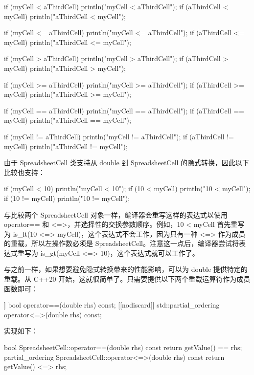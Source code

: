 \begin{cpp}
if (myCell < aThirdCell) { println("myCell < aThirdCell"); }
if (aThirdCell < myCell) { println("aThirdCell < myCell"); }

if (myCell <= aThirdCell) { println("myCell <= aThirdCell"); }
if (aThirdCell <= myCell) { println("aThirdCell <= myCell"); }

if (myCell > aThirdCell) { println("myCell > aThirdCell"); }
if (aThirdCell > myCell) { println("aThirdCell > myCell"); }

if (myCell >= aThirdCell) { println("myCell >= aThirdCell"); }
if (aThirdCell >= myCell) { println("aThirdCell >= myCell"); }

if (myCell == aThirdCell) { println("myCell == aThirdCell"); }
if (aThirdCell == myCell) { println("aThirdCell == myCell"); }

if (myCell != aThirdCell) { println("myCell != aThirdCell"); }
if (aThirdCell != myCell) { println("aThirdCell != myCell"); }
\end{cpp}

由于 SpreadsheetCell 类支持从 double 到 SpreadsheetCell 的隐式转换，因此以下比较也支持：

\begin{cpp}
if (myCell < 10) { println("myCell < 10"); }
if (10 < myCell) { println("10 < myCell"); }
if (10 != myCell) { println("10 != myCell"); }
\end{cpp}

与比较两个 SpreadsheetCell 对象一样，编译器会重写这样的表达式以使用 operator== 和 <=>，并选择性的交换参数顺序。例如，10 < myCell 首先重写为 is\_lt(10 <=> myCell)，这个表达式不会工作，因为只有一种 <=> 作为成员的重载，所以左操作数必须是 SpreadsheetCell。注意这一点后，编译器尝试将表达式重写为 is\_gt(myCell <=> 10)，这个表达式就可以工作了。

与之前一样，如果想要避免隐式转换带来的性能影响，可以为 double 提供特定的重载。从 C++20 开始，这就很简单了。只需要提供以下两个重载运算符作为成员函数即可：

\begin{cpp}
[[nodiscard]] bool operator==(double rhs) const;
[[nodiscard]] std::partial_ordering operator<=>(double rhs) const;
\end{cpp}

实现如下：

\begin{cpp}
bool SpreadsheetCell::operator==(double rhs) const
{
    return getValue() == rhs;
}
partial_ordering SpreadsheetCell::operator<=>(double rhs) const
{
    return getValue() <=> rhs;
}
\end{cpp}


